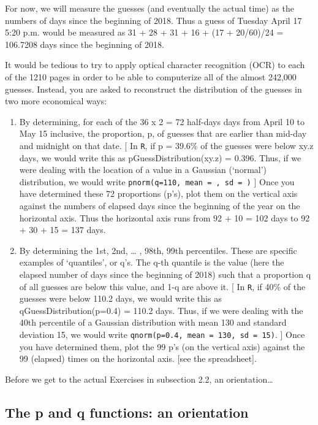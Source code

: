 \documentclass[]{book}
\begin{document}
For now, we will measure the guesses (and eventually the actual time) as the numbers of days since the beginning of 2018. Thus a guess of Tuesday April 17 5:20 p.m. would be measured as 31 + 28 + 31 + 16 + (17 + 20/60)/24 = 106.7208 days since the beginning of 2018.

It would be tedious to try to apply optical character recognition (OCR) to each of the 1210 pages in order to be able to computerize all of the almost 242,000 guesses. Instead, you are asked to reconstruct the distribution of the guesses in two more economical ways:

\begin{enumerate}
\def\labelenumi{\arabic{enumi}.}
\item
  By determining, for each of the 36 x 2 = 72 half-days days from April 10 to May 15 inclusive, the proportion, p, of guesses that are earlier than mid-day and midnight on that date. {[} In \texttt{R}, if p = 39.6\% of the guesses were below xy.z days, we would write this as pGuessDistribution(xy.z) = 0.396. Thus, if we were dealing with the location of a value in a Gaussian (`normal') distribution, we would write \texttt{pnorm(q=110,\ mean\ =\ ,\ sd\ =\ )} {]} Once you have determined these 72 proportions (p's), plot them on the vertical axis against the numbers of elapsed days since the beginning of the year on the horizontal axis. Thus the horizontal axis runs from 92 + 10 = 102 days to 92 + 30 + 15 = 137 days.
\item
  By determining the 1st, 2nd, \ldots{} , 98th, 99th percentiles. These are specific examples of `quantiles', or q's. The q-th quantile is the value (here the elapsed number of days since the beginning of 2018) such that a proportion q of all guesses are below this value, and 1-q are above it. {[} In \texttt{R}, if 40\% of the guesses were below 110.2 days, we would write this as qGuessDistribution(p=0.4) = 110.2 days. Thus, if we were dealing with the 40th percentile of a Gaussian distribution with mean 130 and standard deviation 15, we would write \texttt{qnorm(p=0.4,\ mean\ =\ 130,\ sd\ =\ 15)}. {]} Once you have determined them, plot the 99 p's (on the vertical axis) against the 99 (elapsed) times on the horizontal axis. {[}see the spreadsheet{]}.
\end{enumerate}

Before we get to the actual Exercises in subsection 2.2, an orientation\ldots{}

\hypertarget{the-p-and-q-functions-an-orientation}{%
\subsection{The p and q functions: an orientation}\label{the-p-and-q-functions-an-orientation}}
\end{document}
